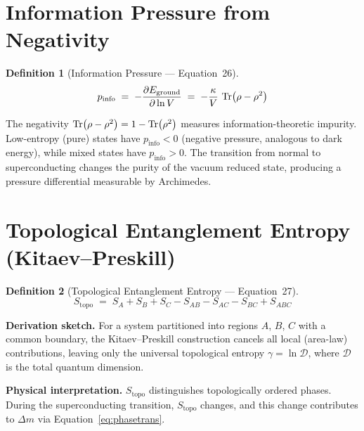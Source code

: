 \documentclass[11pt,a4paper]{article}
\newtheorem{definition}{Definition}[section]
\theoremstyle{remark}
\begin{document}
\section{Information Pressure from Negativity}
\label{sec:eq26}

\begin{definition}[Information Pressure --- Equation~26]
\begin{equation}\label{eq:infopressure}
    p_{\text{info}} \;=\; -\frac{\partial E_{\text{ground}}}{\partial \ln V}
        \;=\; -\frac{\kappa}{V}\,\Tr(\rho - \rho^2)
\end{equation}
\end{definition}

The negativity $\Tr(\rho - \rho^2) = 1 - \Tr(\rho^2)$ measures information-theoretic impurity.  Low-entropy (pure) states have $p_{\text{info}} < 0$ (negative pressure, analogous to dark energy), while mixed states have $p_{\text{info}} > 0$.  The transition from normal to superconducting changes the purity of the vacuum reduced state, producing a pressure differential measurable by Archimedes.

\section{Topological Entanglement Entropy (Kitaev--Preskill)}
\label{sec:eq27}

\begin{definition}[Topological Entanglement Entropy --- Equation~27]
\begin{equation}\label{eq:kitaev}
    S_{\text{topo}} \;=\; S_A + S_B + S_C - S_{AB} - S_{AC} - S_{BC} + S_{ABC}
\end{equation}
\end{definition}

\textbf{Derivation sketch.}\quad
For a system partitioned into regions $A$, $B$, $C$ with a common boundary, the Kitaev--Preskill construction cancels all local (area-law) contributions, leaving only the universal topological entropy $\gamma = \ln\mathcal{D}$, where $\mathcal{D}$ is the total quantum dimension.

\textbf{Physical interpretation.}\quad
$S_{\text{topo}}$ distinguishes topologically ordered phases.  During the superconducting transition, $S_{\text{topo}}$ changes, and this change contributes to $\Delta m$ via Equation~\eqref{eq:phasetrans}.
\end{document}
